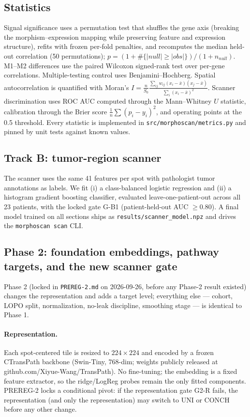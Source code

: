 \documentclass[11pt]{article}
\begin{document}
\subsection{Statistics}
Signal significance uses a permutation test that shuffles the gene axis (breaking the
morphism--expression mapping while preserving feature and expression structure),
refits with frozen per-fold penalties, and recomputes the median held-out correlation
(50 permutations); $p = (1 + \#\{|null| \ge |obs|\})/(1 + n_{null})$. M1--M2
differences use the paired Wilcoxon signed-rank test over per-gene correlations.
Multiple-testing control uses Benjamini--Hochberg. Spatial autocorrelation is
quantified with Moran's
$I = \frac{n}{S_0} \frac{\sum_{ij} w_{ij} (x_i-\bar{x})(x_j-\bar{x})}{\sum_i (x_i-\bar{x})^2}$.
Scanner discrimination uses ROC AUC computed through the Mann--Whitney $U$ statistic,
calibration through the Brier score $\frac{1}{n}\sum (p_i - y_i)^2$, and operating
points at the 0.5 threshold. Every statistic is implemented in
\texttt{src/morphoscan/metrics.py} and pinned by unit tests against known values.

\subsection{Track B: tumor-region scanner}
The scanner uses the same 41 features per spot with pathologist tumor annotations as
labels. We fit (i) a class-balanced logistic regression and (ii) a histogram gradient
boosting classifier, evaluated leave-one-patient-out across all 23 patients, with the
locked gate G-B1 (patient-held-out AUC $\ge 0.80$). A final model trained on all
sections ships as \texttt{results/scanner\_model.npz} and drives the
\texttt{morphoscan scan} CLI.

\subsection{Phase 2: foundation embeddings, pathway targets, and the new scanner gate}
Phase 2 (locked in \texttt{PREREG-2.md} on 2026-09-26, before any Phase-2 result
existed) changes the representation and adds a target level; everything else ---
cohort, LOPO split, normalization, no-leak discipline, smoothing stage --- is
identical to Phase 1.
\paragraph{Representation.} Each spot-centered tile is resized to $224\times224$ and
encoded by a frozen CTransPath backbone (Swin-Tiny, 768-dim; weights publicly
released at github.com/Xiyue-Wang/TransPath). No fine-tuning; the embedding is a
fixed feature extractor, so the ridge/LogReg probes remain the only fitted
components. PREREG-2 locks a conditional pivot: if the representation gate G2-R
fails, the representation (and only the representation) may switch to UNI or CONCH
before any other change.
\end{document}
